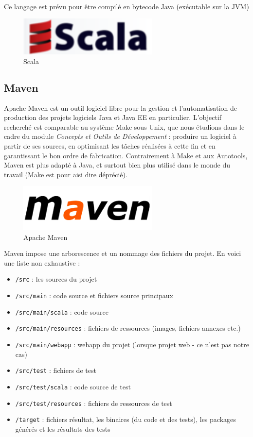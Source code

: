 \documentclass[a4paper,11pt]{article}
\begin{document}
Ce langage est prévu pour être compilé en bytecode Java (exécutable sur la JVM)

	\begin{figure}[!ht]
		\center
		\includegraphics [width=70mm]{./images/scala.png}
		\caption{Scala}
	\end{figure}

\subsection{Maven}
Apache Maven est un outil logiciel libre pour la gestion et l'automatisation de production des projets logiciels Java et Java EE en particulier. L'objectif recherché est comparable au système Make sous Unix, que nous étudions dans le cadre du module \textit{Concepts et Outils de Développement} : produire un logiciel à partir de ses sources, en optimisant les tâches réalisées à cette fin et en garantissant le bon ordre de fabrication. Contrairement à Make et aux Autotools, Maven est plus adapté à Java, et surtout bien plus utilisé dans le monde du travail (Make est pour aisi dire déprécié).

	\begin{figure}[!ht]
		\center
		\includegraphics [width=70mm]{./images/maven.png}
		\caption{Apache Maven}
	\end{figure}

Maven impose une arborescence et un nommage des fichiers du projet. En voici une liste non exhaustive :
	\begin{itemize}
		\item \texttt{/src} : les sources du projet
		\item \texttt{/src/main} : code source et fichiers source principaux
		\item \texttt{/src/main/scala} : code source
		\item \texttt{/src/main/resources} : fichiers de ressources (images, fichiers annexes etc.)
		\item \texttt{/src/main/webapp} : webapp du projet (lorsque projet web - ce n'est pas notre cas)
		\item \texttt{/src/test} : fichiers de test
		\item \texttt{/src/test/scala} : code source de test
		\item \texttt{/src/test/resources} : fichiers de ressources de test
		\item \texttt{/target} : fichiers résultat, les binaires (du code et des tests), les packages générés et les résultats des tests
	\end{itemize}
	
\end{document}
